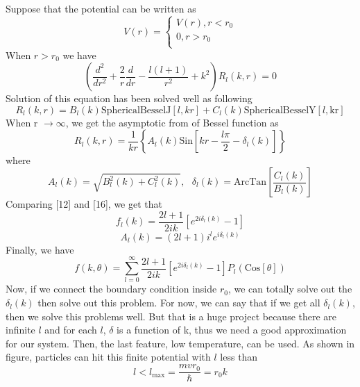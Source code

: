 Suppose that the potential can be written as
\begin{equation}
V(r)=\left\{
\begin{array}{c}
 V(r), r<r_0 \\
 0, r>r_0 \\
\end{array}
\right.
\end{equation}
When $r>r_0$ we have
\begin{equation}
\left(\frac{d^2}{dr^2}+\frac{2}{r}\frac{d}{dr}-\frac{l(l+1)}{r^2}+k^2\right)R_l(k,r)=0
\end{equation}
Solution of this equation has been solved well as following
\begin{equation}
R_l(k,r)=B_l(k)\text{SphericalBesselJ}[l,kr]+C_l(k)\text{SphericalBesselY}[l,\text{kr}]
\end{equation}
When r $\to \infty $, we get the asymptotic from of Bessel function as
\begin{equation}
R_l(k,r)=\frac{1}{k r}\left\{A_l(k)\text{Sin}\left[k r-\frac{l \pi }{2}-\delta _l(k)\right]\right\}
\end{equation}
where
\begin{equation}
A_l(k)=\sqrt{B_l^2(k)+C_l^2(k)},\text{  }\delta _l(k)=\text{ArcTan}\left[\frac{C_l(k)}{B_l(k)}\right]
\end{equation}
Comparing [12] and [16], we get that
\begin{equation}
f_l(k)=\frac{2l+1}{2i k}\left[e^{2i \delta _l(k)}-1\right]
\end{equation}
\begin{equation}
A_l(k)=(2l+1)i^le^{i \delta _l(k)}
\end{equation}
Finally, we have
\begin{equation}
f(k,\theta )=\sum _{l =0}^{\infty } \frac{2l+1}{2i k}\left[e^{2i \delta _l(k)}-1\right]P_l(\text{Cos}[\theta ])
\end{equation}
Now, if we connect the boundary condition inside $r_0$, we can totally solve out the $\delta _l(k)$ then solve out this problem.
For now, we can say that if we get all $\delta _l(k)$, then we solve this problems well. But that is a huge project because there are infinite $l$ and for each $l$, $\delta$ is a function of k, thus we need a good approximation for our system. Then, the last feature, low temperature, can be used. 
As shown in figure, particles can hit this finite potential with $l$ less than 
\begin{equation}
l<l_{\max }=\frac{m v r_0}{\hbar }=r_0 k
\end{equation}
